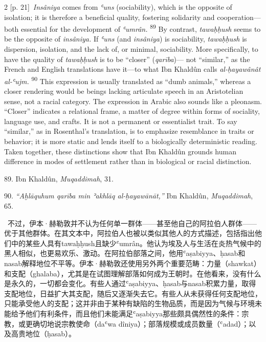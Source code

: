 \documentclass[10pt,a4paper]{article}
\begin{document}
\begin{paracol}{2}
{\scriptsize\color{gray} [p. 21]}\ \textit{Insâniya} comes from \textit{ʿuns} (sociability), which is the opposite of isolation; it is therefore a beneficial quality, fostering solidarity and cooperation—both essential for the development of \textit{ʿumrân.} \nobreak\textsuperscript{89} By contrast, \textit{tawaḥḥush} seems to be the opposite of \textit{insâniya.} If \textit{ʿuns} (and \textit{insâniya}) is sociability, \textit{tawaḥḥush} is dispersion, isolation, and the lack of, or minimal, sociability. More specifically, to have the quality of \textit{tawaḥḥush} is to be “closer” (\textit{qarība})— not “similar,” as the French and English translations have it—to what Ibn Khaldûn calls \textit{al-ḥayawânât al-ʿujm.} \nobreak\textsuperscript{90} This expression is usually translated as “dumb animals,” whereas a closer rendering would be beings lacking articulate speech in an Aristotelian sense, not a racial category. The expression in Arabic also sounds like a pleonasm. “Closer” indicates a relational frame, a matter of degree within forms of sociality, language use, and crafts. It is not a permanent or essentialist trait. To say “similar,” as in Rosenthal’s translation, is to emphasize resemblance in traits or behavior; it is more static and lends itself to a biologically deterministic reading. Taken together, these distinctions show that Ibn Khaldûn grounds human difference in modes of settlement rather than in biological or racial distinction.\par{\small 89. Ibn Khaldûn, \textit{Muqaddimah}, 31.\par}{\small 90. \textit{“Aḫlāquhum qarība min ʾakhlāq al-ḥayawānāt,”} Ibn Khaldûn, \textit{Muqaddimah}, 65.\par}
\switchcolumn*
{\scriptsize\color{gray} [p. 21]}\ 不过，伊本·赫勒敦并不认为任何单一群体——甚至他自己的阿拉伯人群体——优于其他群体。在其文本中，阿拉伯人也被以类似其他人的方式描述，包括指出他们中的某些人具有tawaḥḥush且缺少ʿumrân。他认为埃及人与生活在炎热气候中的黑人相似，也更易欢乐、激动。在阿拉伯部落之间，他用ʿaṣabiyya、ḥasab和nasab解释地位不平等。伊本·赫勒敦还使用另外两个重要范畴：力量（shawkat）和支配（ghalaba），尤其是在试图理解部落如何成为王朝时。在他看来，没有什么是永久的，一切都会变化。有些人通过ʿaṣabiyya、ḥasab与nasab积累力量，取得支配地位，日益扩大其支配，随后又逐渐失去它。有些人从未获得任何支配地位，只能承受他人的支配；这并非由于某种有缺陷的生物品质，而是因为气候与环境未能给予他们有利条件，而且他们未能满足ʿaṣabiyya那些颇具偶然性的条件：宗教，或更确切地说宗教使命（daʿwa dîniya）；部落规模或成员数量（ʿadad）；以及高贵地位（ḥasab）。\par

\end{paracol}
\end{document}
